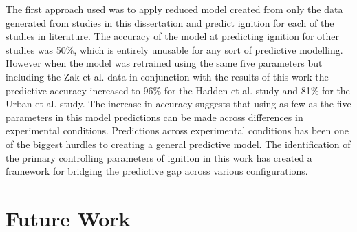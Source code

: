     The first approach used was to apply reduced model created from only the data generated from studies in this dissertation and predict ignition for each of the studies in literature. The accuracy of the model at predicting ignition for other studies was 50\%, which is entirely unusable for any sort of predictive modelling. However when the model was retrained using the same five parameters but including the Zak et al. data in conjunction with the results of this work the predictive accuracy increased to 96\% for the Hadden et al. study and 81\% for the Urban et al. study. The increase in accuracy suggests that using as few as the five parameters in this model predictions can be made across differences in experimental conditions. Predictions across experimental conditions has been one of the biggest hurdles to creating a general predictive model. The identification of the primary controlling parameters of ignition in this work has created a framework for bridging the predictive gap across various configurations.  
    
\section{Future Work}
    